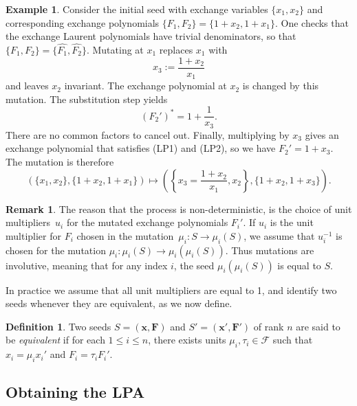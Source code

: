 \documentclass[10pt,a4paper]{amsart}
\numberwithin{equation}{section}
\theoremstyle{definition}
\newtheorem{defn}[thm]{Definition}
\newtheorem{eg}[thm]{Example}
\newtheorem{rmk}[thm]{Remark}
\begin{document}
 \begin{eg} \label{eg:mutation}
	Consider the initial seed with exchange variables $\{x_1, x_2\}$ and corresponding exchange polynomials $\{F_1, F_2\} = \{1 + x_2, 1 + x_1\}$. One checks that the exchange Laurent polynomials have trivial denominators, so that $\{F_1, F_2\} = \big\{\hat{F_1}, \hat{F_2}\big\}$. Mutating at $x_1$ replaces $x_1$ with
	\[
	x_3 := \frac{1+x_2}{x_1}
	\]
	and leaves $x_2$ invariant. The exchange polynomial at $x_2$ is changed by this mutation. The substitution step yields
	\[
	(F_2')^* = 1 + \frac{1}{x_3}.
	\]
	There are no common factors to cancel out. Finally, multiplying by $x_3$ gives an exchange polynomial that satisfies (LP1) and (LP2), so we have $F_2' = 1 + x_3$. The mutation is therefore
	\[
	( \{x_1, x_2\}, \{1 + x_2, 1 + x_1\} ) \mapsto \left( \left\{x_3 = \frac{1 + x_2}{x_1}, x_2\right\}, \{1 + x_2, 1 + x_3\} \right).
	\]
\end{eg}

\begin{rmk}\label{rmk!non-det}
The reason that the process is non-deterministic, is the choice of unit multipliers~$u_i$ for the mutated exchange polynomials $F_i'$. If $u_i$ is the unit multiplier for $F_i$ chosen in the mutation~${\mu_i\colon S\to \mu_i(S)}$, we assume that $u_i^{-1}$ is chosen for the mutation $\mu_i\colon \mu_i(S)\to \mu_i(\mu_i(S))$. Thus mutations are involutive, meaning that for any index $i$, the seed $\mu_i(\mu_i(S))$ is equal to $S$.

In practice we assume that all unit multipliers are equal to 1, and identify two seeds whenever they are equivalent, as we now define.
\end{rmk}

\begin{defn}
	Two seeds $S = (\bm{x},\bm{F})$ and $S' = (\bm{x}',\bm{F}')$ of rank $n$ are said to be \textit{equivalent} if for each $1 \leq i \leq n$, there exists units $\mu_i, \tau_i \in \mathcal{F}$ such that $x_i = \mu_i x_i'$ and $F_i = \tau_i F_i'$.
\end{defn}

\subsection{Obtaining the LPA}
\end{document}
